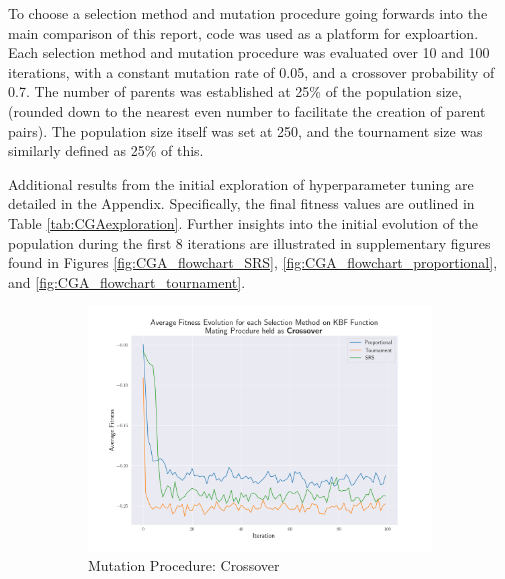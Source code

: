 \documentclass[10pt]{article}
\begin{document}
\begin{multicols}{2}
To choose a selection method and mutation procedure going forwards into the main comparison of this report, code %
was used as a platform for exploartion. Each selection method and mutation procedure was evaluated over 10 and 100 iterations, with a constant mutation rate of 0.05, and a crossover probability of 0.7. The number of parents was established at 25\% of the population size, (rounded down to the nearest even number to facilitate the creation of parent pairs). The population size itself was set at 250, and the tournament size was similarly defined as 25\% of this.

Additional results from the initial exploration of hyperparameter tuning are detailed in the Appendix. Specifically, the final fitness values are outlined in Table \ref{tab:CGAexploration}. Further insights into the initial evolution of the population during the first 8 iterations are illustrated in supplementary figures found in Figures \ref{fig:CGA_flowchart_SRS}, \ref{fig:CGA_flowchart_proportional}, and \ref{fig:CGA_flowchart_tournament}.
\begin{figure}[H]
    \centering
    \begin{subfigure}{0.44\textwidth}
        \includegraphics[width=\textwidth]{../figures/Permanent Images/Fitness_Evolution_Crossover.png}
        \caption{Mutation Procedure: Crossover}
    \end{subfigure}
    \begin{subfigure}{0.44\textwidth}

\end{subfigure}
\end{figure}
\end{multicols}
\end{document}
